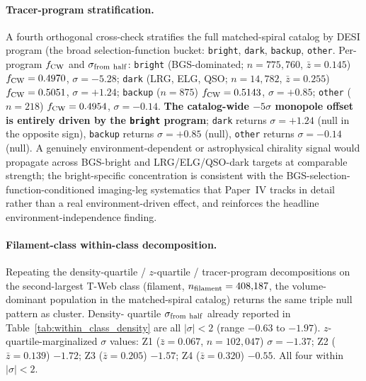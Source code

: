 \documentclass[aps,prd,twocolumn,superscriptaddress,showpacs,preprintnumbers,nofootinbib,longbibliography,floatfix]{revtex4-2}
\begin{document}
\paragraph{Tracer-program stratification.} A fourth orthogonal
cross-check stratifies the full matched-spiral catalog by DESI
program (the broad selection-function bucket: \texttt{bright},
\texttt{dark}, \texttt{backup}, \texttt{other}.
Per-program $f_{\rm CW}$ and $\sigma_{\rm from\ half}$:
\texttt{bright} (BGS-dominated; $n = 775{,}760$, $\bar z = 0.145$)
$f_{\rm CW} = 0.4970$, $\sigma = -5.28$; \texttt{dark} (LRG, ELG, QSO;
$n = 14{,}782$, $\bar z = 0.255$) $f_{\rm CW} = 0.5051$,
$\sigma = +1.24$; \texttt{backup} ($n = 875$) $f_{\rm CW} = 0.5143$,
$\sigma = +0.85$; \texttt{other} ($n = 218$) $f_{\rm CW} = 0.4954$,
$\sigma = -0.14$. \textbf{The catalog-wide $-5\sigma$ monopole offset is
entirely driven by the \texttt{bright} program}; \texttt{dark} returns
$\sigma = +1.24$ (null in the opposite sign), \texttt{backup} returns
$\sigma = +0.85$ (null), \texttt{other} returns $\sigma = -0.14$
(null). A genuinely environment-dependent or astrophysical chirality
signal would propagate across BGS-bright and LRG/ELG/QSO-dark targets
at comparable strength; the bright-specific concentration is consistent
with the BGS-selection-function-conditioned imaging-leg systematics
that Paper~IV tracks in detail rather than a real environment-driven
effect, and reinforces the headline environment-independence finding.

\paragraph{Filament-class within-class decomposition.} Repeating the
density-quartile / $z$-quartile / tracer-program decompositions on
the second-largest T-Web class (filament, $n_{\rm filament} =
408{,}187$, the volume-dominant population in the matched-spiral
catalog) returns the same triple null pattern as cluster. Density-
quartile $\sigma_{\rm from\ half}$ already reported in
Table~\ref{tab:within_class_density} are all $|\sigma| < 2$ (range
$-0.63$ to $-1.97$). $z$-quartile-marginalized $\sigma$ values:
Z1 ($\bar z = 0.067$, $n = 102{,}047$) $\sigma = -1.37$;
Z2 ($\bar z = 0.139$) $-1.72$; Z3 ($\bar z = 0.205$) $-1.57$;
Z4 ($\bar z = 0.320$) $-0.55$. All four within $|\sigma| < 2$.
\end{document}
